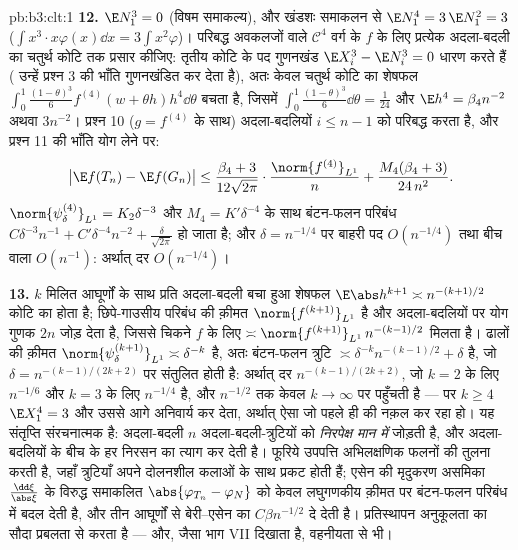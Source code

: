 \begin{solution}{pb:b3:clt:1}
\textbf{12.} $\E N_1^3 = 0$ (विषम समाकल्य), और खंडशः समाकलन
से $\E N_1^4 = 3\,\E N_1^2 = 3$
($\int x^3\cdot x\varphi(x)\dd x =
3\int x^2\varphi$)। परिबद्ध अवकलजों वाले $\mathcal C^4$ वर्ग
के $f$ के लिए प्रत्येक अदला-बदली का चतुर्थ कोटि तक प्रसार
कीजिए: तृतीय कोटि के पद गुणनखंड $\E X_i^3 - \E N_i^3 =
0$ धारण करते हैं ( उन्हें प्रश्न 3 की भाँति
गुणनखंडित कर देता है), अतः केवल चतुर्थ कोटि का शेषफल
$\int_0^1\frac{(1-\theta)^3}6f^{(4)}(w + \theta
h)h^4\dd\theta$ बचता है, जिसमें $\int_0^1
\frac{(1-\theta)^3}6\dd\theta = \frac1{24}$ और $\E h^4 =
\beta_4n^{-2}$ अथवा $3n^{-2}$। प्रश्न 10 ($g =
f^{(4)}$ के साथ) अदला-बदलियों $i \leq n - 1$ को परिबद्ध
करता है, और प्रश्न 11 की भाँति योग लेने पर:
\[
\bigl|\E f(T_n) - \E f(G_n)\bigr| \leq
\frac{\beta_4 + 3}{12\sqrt{2\pi}}\cdot
\frac{\norm{f^{(4)}}_{L^1}}{n} +
\frac{M_4(\beta_4 + 3)}{24\,n^2} .
\]
$\norm{\psi_\delta^{(4)}}_{L^1} = K_2\delta^{-3}$ और
$M_4 = K'\delta^{-4}$ के साथ बंटन-फलन परिबंध
$C\delta^{-3}n^{-1} + C'\delta^{-4}n^{-2} +
\frac\delta{\sqrt{2\pi}}$ हो जाता है; और $\delta = n^{-1/4}$
पर बाहरी पद $O(n^{-1/4})$ तथा बीच वाला $O(n^{-1})$: अर्थात्
दर $O(n^{-1/4})$।

\textbf{13.} $k$ मिलित आघूर्णों के साथ प्रति अदला-बदली बचा
हुआ शेषफल $\E\abs h^{k+1} \asymp
n^{-(k+1)/2}$ कोटि का होता है; छिपे-गाउसीय परिबंध की क़ीमत
$\norm{f^{(k+1)}}_{L^1}$ है और अदला-बदलियों पर योग गुणक $2n$
जोड़ देता है, जिससे चिकने $f$ के लिए
$\asymp\norm{f^{(k+1)}}_{L^1}\,
n^{-(k-1)/2}$ मिलता है। ढालों की क़ीमत
$\norm{\psi_\delta^{(k+1)}}_{L^1} \asymp \delta^{-k}$ है,
अतः बंटन-फलन त्रुटि $\asymp
\delta^{-k}n^{-(k-1)/2} + \delta$ है, जो $\delta =
n^{-(k-1)/(2k+2)}$ पर संतुलित होती है: अर्थात् दर
$n^{-(k-1)/(2k+2)}$, जो $k = 2$ के लिए $n^{-1/6}$ और $k = 3$
के लिए $n^{-1/4}$ है, और $n^{-1/2}$ तक केवल $k \to \infty$
पर पहुँचती है --- पर $k \geq 4$ $\E X_1^4 = 3$ और उससे आगे
अनिवार्य कर देता, अर्थात् ऐसा  जो पहले ही 
की नक़ल कर रहा हो। यह संतृप्ति संरचनात्मक है: अदला-बदली $n$
अदला-बदली-त्रुटियों को \emph{निरपेक्ष मान में} जोड़ती है,
और अदला-बदलियों के बीच के हर निरसन का त्याग कर देती है।
फूरिये उपपत्ति अभिलक्षणिक फलनों की तुलना करती है, जहाँ
त्रुटियाँ अपने दोलनशील कलाओं के साथ प्रकट होती हैं; एसेन की
मृदुकरण असमिका $\frac{\dd\xi}{\abs\xi}$ के विरुद्ध समाकलित
$\abs{\varphi_{T_n}
- \varphi_N}$ को केवल लघुगणकीय क़ीमत पर बंटन-फलन परिबंध में
बदल देती है, और तीन आघूर्णों से बेरी--एसेन का $C\beta
n^{-1/2}$ दे देती है। प्रतिस्थापन अनुकूलता का सौदा
प्रबलता से करता है --- और, जैसा भाग VII दिखाता है,
वहनीयता से भी।


\end{solution}

